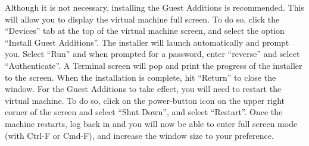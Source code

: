 \documentclass[11pt,a4paper]{scrartcl}
\begin{document}
Although it is not necessary, installing the Guest Additions is recommended.
This will allow you to display the virtual machine full screen. To do so, click
the ``Devices'' tab at the top of the virtual machine screen, and select the
option ``Install Guest Additions''. The installer will launch automatically and
prompt you. Select ``Run'' and when prompted for a password, enter ``reverse'' and
select ``Authenticate''. A Terminal screen will pop and print the progress of the
installer to the screen. When the installation is complete, hit “Return” to
close the window. For the Guest Additions to take effect, you will need to
restart the virtual machine. To do so, click on the power-button icon on the
upper right corner of the screen and select ``Shut Down'', and select ``Restart''.
Once the machine restarts, log back in and you will now be able to enter full
screen mode (with Ctrl-F or Cmd-F), and increase the window size to your
preference. 
\end{document}
